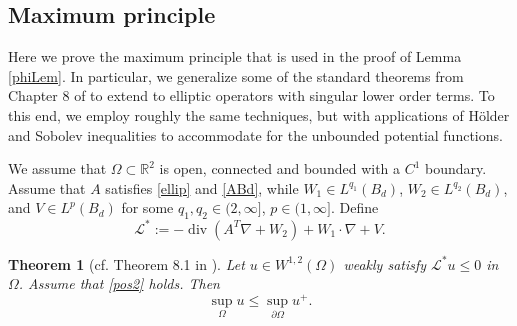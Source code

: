 \documentclass[12pt,reqno]{amsart}
\theoremstyle{plain}
\newtheorem{thm}{Theorem}
\theoremstyle{definition}
\DeclareMathOperator{\di}{div}
\newcommand{\Om}{\Omega}
\newcommand{\iny}{\infty}
\newcommand{\del}{ \partial}
\newcommand{\su}{\subset}
\newcommand{\gr}{\nabla}
\newcommand{\pr}[1]{\left( #1 \right) }
\newcommand{\R}{\ensuremath{\mathbb{R}}}
\begin{document}
\begin{appendix}

\section{Maximum principle}
\label{AppA}
\setcounter{equation}{0}  %

Here we prove the maximum principle that is used in the proof of Lemma \ref{phiLem}.
In particular, we generalize some of the standard theorems from Chapter 8 of \cite{GT01} to extend to elliptic operators with singular lower order terms.
To this end, we employ roughly the same techniques, but with applications of H\"older and Sobolev inequalities to accommodate for the unbounded potential functions.

We assume that $\Om \su \R^2$ is open, connected and bounded with a $C^1$ boundary.
Assume that $A$ satisfies \eqref{ellip} and \eqref{ABd}, while $W_1 \in L^{q_1}\pr{B_d}$, $W_2 \in L^{q_2}\pr{B_d}$, and $V \in L^{p}\pr{B_d}$ for some $q_1, q_2 \in (2, \iny]$, $p \in (1, \iny]$.
Define
$$\mathcal{L}^* := -\di\pr{A^T \gr + W_2} + W_1 \cdot \gr + V.$$

\begin{thm}[cf. Theorem 8.1 in \cite{GT01}]
Let $u \in W^{1,2}\pr{\Om}$ weakly satisfy $\mathcal{L}^* u \le 0$ in $\Om$.
Assume that \eqref{pos2} holds.
Then
$$\sup_{\Om} u \le \sup_{\del \Om} u^+.$$
\label{maxPrinc}
\end{thm}


\end{appendix}
\end{document}
